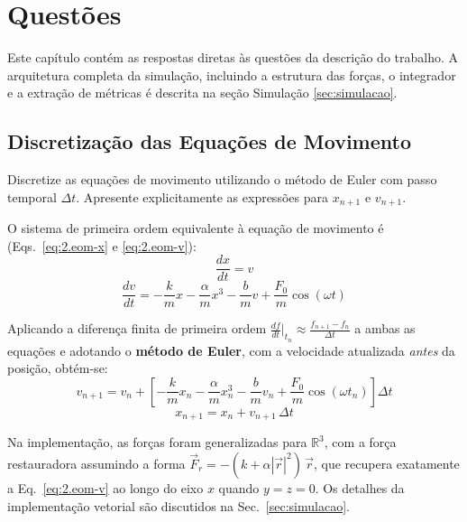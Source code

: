 \section{Questões}
\label{sec:questoes}

Este capítulo contém as respostas diretas às questões da descrição do trabalho. A arquitetura completa da simulação, incluindo a estrutura das forças, o integrador e a extração de métricas é descrita na seção Simulação \ref{sec:simulacao}.

\subsection{Discretização das Equações de Movimento}

\begin{questao}
Discretize as equações de movimento utilizando o método de Euler com passo temporal $\Delta t$.
Apresente explicitamente as expressões para $x_{n+1}$ e $v_{n+1}$.
\end{questao}

O sistema de primeira ordem equivalente à equação de movimento é (Eqs.~\ref{eq:2.eom-x} e \ref{eq:2.eom-v}):
\begin{equation}
    \label{eq:2.eom-x}
    \frac{dx}{dt} = v
\end{equation}
\begin{equation}
    \label{eq:2.eom-v}
    \frac{dv}{dt} = -\frac{k}{m}x - \frac{\alpha}{m}x^3 - \frac{b}{m}v + \frac{F_0}{m}\cos(\omega t)
\end{equation}

Aplicando a diferença finita de primeira ordem $\displaystyle\frac{df}{dt}\bigg|_{t_n} \approx \frac{f_{n+1} - f_n}{\Delta t}$ a ambas as equações e adotando o \textbf{método de Euler}, com a velocidade atualizada \emph{antes} da posição, obtém-se:
\begin{equation}
    \label{eq:2.euler-v}
    \boxed{v_{n+1} = v_n + \left[-\frac{k}{m}x_n - \frac{\alpha}{m}x_n^3 - \frac{b}{m}v_n + \frac{F_0}{m}\cos(\omega t_n)\right]\Delta t}
\end{equation}
\begin{equation}
    \label{eq:2.euler-x}
    \boxed{x_{n+1} = x_n + v_{n+1}\,\Delta t}
\end{equation}

Na implementação, as forças foram generalizadas para $\mathbb{R}^3$, com a força restauradora assumindo a forma $\vec{F}_r = -(k + \alpha|\vec{r}|^2)\,\vec{r}$, que recupera exatamente a Eq.~\ref{eq:2.eom-v} ao longo do eixo $x$ quando $y = z = 0$. Os detalhes da implementação vetorial são discutidos na Sec.~\ref{sec:simulacao}.

